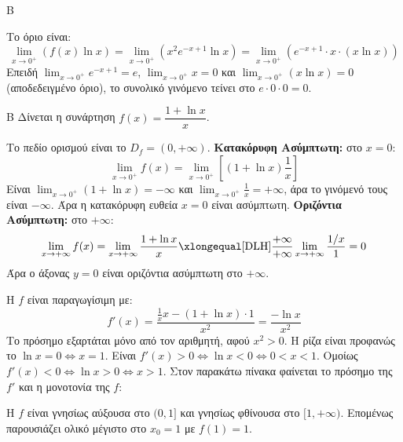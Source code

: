 \begin{thema}{Β}
\begin{erwthma}
\item Το όριο είναι:
\[ \lim_{x\to0^+} (f(x) \ln x) = \lim_{x\to0^+} (x^2 e^{-x+1} \ln x) = \lim_{x\to0^+} ( e^{-x+1} \cdot x \cdot (x \ln x) ) \]
Επειδή $\lim_{x\to0^+} e^{-x+1} = e$, $\lim_{x\to0^+} x = 0$ και $\lim_{x\to0^+} (x \ln x) = 0$ (αποδεδειγμένο όριο), το συνολικό γινόμενο τείνει στο $e \cdot 0 \cdot 0 = 0$.
\end{erwthma}
\end{thema}

\begin{thema}{Β}
Δίνεται η συνάρτηση $f(x) = \dfrac{1+\ln x}{x}$.

\begin{erwthma}
\item Το πεδίο ορισμού είναι το $D_f = (0, +\infty)$.
\textbf{Κατακόρυφη Ασύμπτωτη:} στο $x=0$:
\[ \lim_{x\to0^+} f(x) = \lim_{x\to0^+} \left[ (1+\ln x)\frac{1}{x} \right] \]
Είναι $\lim_{x\to0^+} (1+\ln x) = -\infty$ και $\lim_{x\to0^+} \frac{1}{x} = +\infty$, άρα το γινόμενό τους είναι $-\infty$.
Άρα η κατακόρυφη ευθεία $x = 0$ είναι ασύμπτωτη.
\textbf{Οριζόντια Ασύμπτωτη:} στο $+\infty$:
\[ \lim_{x\to+\infty} f(x) = \lim_{x\to+\infty} \frac{1+\ln x}{x} \xlongequal[\text{DLH}]{\frac{+\infty}{+\infty}} \lim_{x\to+\infty} \frac{1/x}{1} = 0 \]
Άρα ο άξονας $y=0$ είναι οριζόντια ασύμπτωτη στο $+\infty$.

\item Η $f$ είναι παραγωγίσιμη με:
\[ f'(x) = \frac{\frac{1}{x}x - (1+\ln x)\cdot 1}{x^2} = \frac{-\ln x}{x^2} \]
Το πρόσημο εξαρτάται μόνο από τον αριθμητή, αφού $x^2 > 0$. Η ρίζα είναι προφανώς το $\ln x = 0 \Leftrightarrow x = 1$.
Είναι $f'(x) > 0 \Leftrightarrow \ln x < 0 \Leftrightarrow 0 < x < 1$.
Ομοίως $f'(x) < 0 \Leftrightarrow \ln x > 0 \Leftrightarrow x > 1$.
Στον παρακάτω πίνακα φαίνεται το πρόσημο της $f'$ και η μονοτονία της $f$:
\begin{center}
\end{center}
Η $f$ είναι γνησίως αύξουσα στο $(0, 1]$ και γνησίως φθίνουσα στο $[1, +\infty)$.
Επομένως παρουσιάζει ολικό μέγιστο στο $x_0 = 1$ με $f(1) = 1$.


\end{erwthma}
\end{thema}
